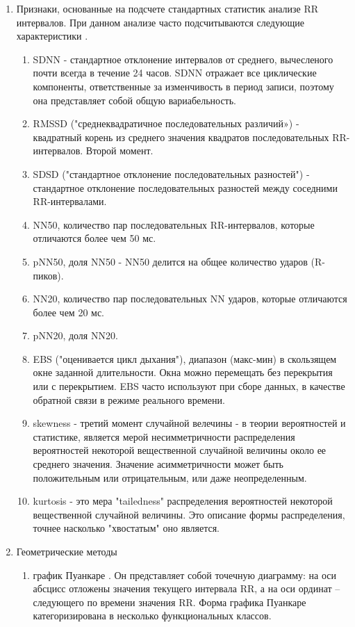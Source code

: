 \begin{enumerate}
	\item Признаки, основанные на подсчете стандартных статистик анализе RR интервалов. При данном анализе часто подсчитываются следующие характеристики \cite{pNN, metric_of_hrv}.
	\begin{enumerate}
		\item SDNN - стандартное отклонение интервалов от среднего, вычесленого почти всегда в течение 24 часов. SDNN отражает все циклические компоненты, ответственные за изменчивость в период записи, поэтому она представляет собой общую вариабельность.
		\item 	RMSSD ("среднеквадратичное последовательных различий») - квадратный корень из среднего значения квадратов последовательных RR-интервалов. Второй момент.
		\item SDSD ("стандартное отклонение последовательных разностей") - стандартное отклонение последовательных разностей между соседними  RR-интервалами.
		\item NN50, количество пар последовательных RR-интервалов, которые отличаются более чем 50 мс.
		\item pNN50, доля NN50 - NN50 делится на общее количество ударов (R-пиков).
		\item NN20, количество пар последовательных NN ударов, которые отличаются более чем 20 мс.
		\item pNN20, доля NN20.
		\item EBS ("оценивается цикл дыхания"), диапазон (макс-мин) в скользящем окне заданной длительности. Окна можно перемещать без перекрытия или с перекрытием. EBS часто используют при сборе данных, в качестве обратной связи в режиме реального времени.
		\item skewness - третий момент случайной велечины - в теории вероятностей и статистике, является мерой несимметричности распределения вероятностей некоторой вещественной случайной величины около ее среднего значения. Значение асимметричности может быть положительным или отрицательным, или даже неопределенным.
		\item kurtosis - это мера "tailedness" распределения вероятностей некоторой вещественной случайной величины. Это описание формы распределения, точнее насколько "хвостатым" оно является. 
	\end{enumerate}
	\item Геометрические методы \cite{geometric_metric}
	\begin{enumerate}
		\item график Пуанкаре \cite{poinkare_plot}. Он представляет собой точечную диаграмму: на оси абсцисс отложены значения текущего интервала RR, а на оси ординат – следующего по времени значения RR. Форма графика Пуанкаре категоризирована в несколько функциональных классов.

\end{enumerate}
\end{enumerate}
